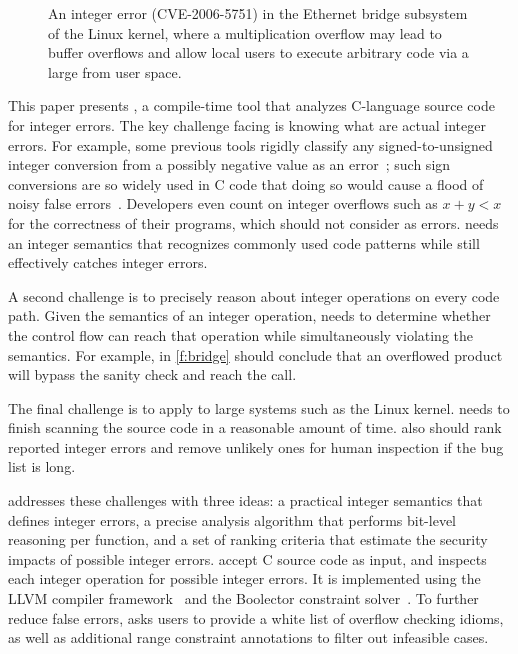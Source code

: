 \begin{figure}[t]
\centering

\vspace{-1em}
\caption{An integer error (CVE-2006-5751) in the Ethernet
bridge subsystem of the Linux kernel, where a multiplication overflow
may lead to buffer overflows and allow local users to execute
arbitrary code via a large  from user space.
}
\label{f:bridge}
\end{figure}

This paper presents \sys, a compile-time tool that analyzes C-language
source code for integer errors.
%
The key challenge facing \sys is knowing what are actual integer
errors.
For example, some previous tools
rigidly classify any signed-to-unsigned integer conversion from a
possibly negative value as an error~\cite{brumley:rich, moy:z3prefix,
seacord:secure-c}; such sign conversions are so widely used in C
code that doing so would cause a flood of noisy false
errors~\cite[\subsectionautorefname~6.2]{moy:z3prefix}.
Developers even count on integer overflows
such as $x + y < x$ for the correctness of their programs,
which \sys should not consider as errors.
\sys needs an integer semantics that recognizes commonly used code
patterns while still effectively catches integer errors.

A second challenge is to precisely reason about integer operations
on every code path.  Given the semantics of an integer operation,
\sys needs to determine whether the control flow can reach that
operation while simultaneously violating the semantics.  For
example, in \autoref{f:bridge} \sys should conclude that an overflowed
product  will bypass the sanity check and reach the
 call.

The final challenge is to apply \sys to large systems such as the
Linux kernel.  \sys needs to finish scanning the source code in a
reasonable amount of time.  \sys also should rank reported integer
errors and remove unlikely ones for human inspection if the bug
list is long.

\sys addresses these challenges with three ideas: a practical integer
semantics that defines integer errors, a precise analysis algorithm
that performs bit-level reasoning per function, and a set of ranking
criteria that estimate the security impacts of possible integer
errors.  \sys accept C source code as input, and inspects each
integer operation for possible integer errors.
%
It is implemented using the LLVM compiler framework~\cite{lattner:llvm}
and the Boolector constraint solver~\cite{boolector}.
%
To further reduce false errors, \sys asks users to provide a white
list of overflow checking idioms, as well as additional range
constraint annotations to filter out infeasible cases.

